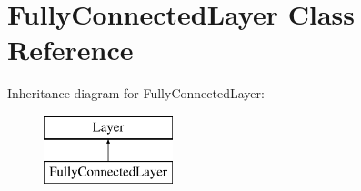 \hypertarget{class_fully_connected_layer}{\section{Fully\+Connected\+Layer Class Reference}
\label{class_fully_connected_layer}
}
Inheritance diagram for Fully\+Connected\+Layer\+:\begin{figure}[H]
\begin{center}
\leavevmode
\includegraphics[height=2.000000cm]{class_fully_connected_layer}
\end{center}
\end{figure}
